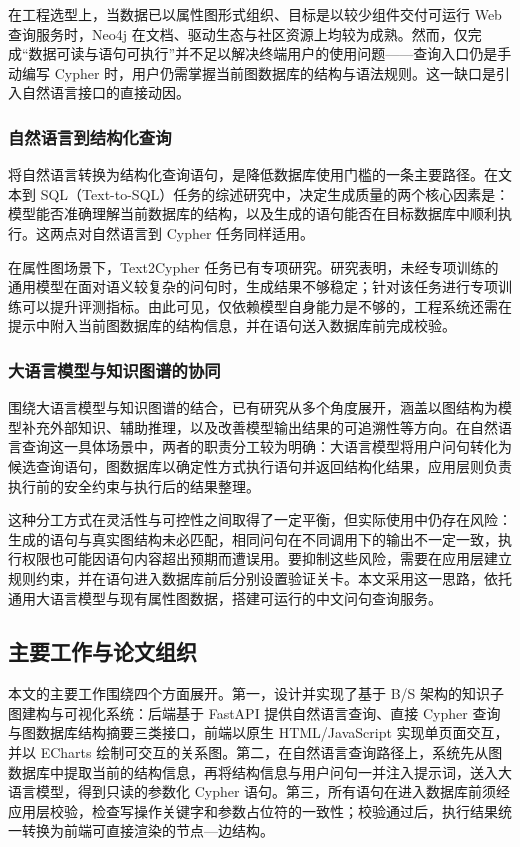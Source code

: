 \documentclass[12pt,a4paper]{article}
\begin{document}
在工程选型上，当数据已以属性图形式组织、目标是以较少组件交付可运行 Web 查询服务时，Neo4j 在文档、驱动生态与社区资源上均较为成熟\cite{ref12}。然而，仅完成“数据可读与语句可执行”并不足以解决终端用户的使用问题——查询入口仍是手动编写 Cypher 时，用户仍需掌握当前图数据库的结构与语法规则。这一缺口是引入自然语言接口的直接动因。

\subsubsection{自然语言到结构化查询}

将自然语言转换为结构化查询语句，是降低数据库使用门槛的一条主要路径。在文本到 SQL（Text-to-SQL）任务的综述研究中，决定生成质量的两个核心因素是：模型能否准确理解当前数据库的结构，以及生成的语句能否在目标数据库中顺利执行\cite{ref5}。这两点对自然语言到 Cypher 任务同样适用。

在属性图场景下，Text2Cypher 任务已有专项研究。研究表明，未经专项训练的通用模型在面对语义较复杂的问句时，生成结果不够稳定；针对该任务进行专项训练可以提升评测指标\cite{ref16}。由此可见，仅依赖模型自身能力是不够的，工程系统还需在提示中附入当前图数据库的结构信息，并在语句送入数据库前完成校验。

\subsubsection{大语言模型与知识图谱的协同}

围绕大语言模型与知识图谱的结合，已有研究从多个角度展开，涵盖以图结构为模型补充外部知识、辅助推理，以及改善模型输出结果的可追溯性等方向\cite{ref11}。在自然语言查询这一具体场景中，两者的职责分工较为明确：大语言模型将用户问句转化为候选查询语句，图数据库以确定性方式执行语句并返回结构化结果，应用层则负责执行前的安全约束与执行后的结果整理\cite{ref4,ref9,ref11}。

这种分工方式在灵活性与可控性之间取得了一定平衡，但实际使用中仍存在风险：生成的语句与真实图结构未必匹配，相同问句在不同调用下的输出不一定一致，执行权限也可能因语句内容超出预期而遭误用。要抑制这些风险，需要在应用层建立规则约束，并在语句进入数据库前后分别设置验证关卡。本文采用这一思路，依托通用大语言模型与现有属性图数据，搭建可运行的中文问句查询服务。

\subsection{主要工作与论文组织}

本文的主要工作围绕四个方面展开。第一，设计并实现了基于 B/S 架构的知识子图建构与可视化系统：后端基于 FastAPI 提供自然语言查询、直接 Cypher 查询与图数据库结构摘要三类接口，前端以原生 HTML/JavaScript 实现单页面交互，并以 ECharts 绘制可交互的关系图。第二，在自然语言查询路径上，系统先从图数据库中提取当前的结构信息，再将结构信息与用户问句一并注入提示词，送入大语言模型，得到只读的参数化 Cypher 语句。第三，所有语句在进入数据库前须经应用层校验，检查写操作关键字和参数占位符的一致性；校验通过后，执行结果统一转换为前端可直接渲染的节点—边结构。
\end{document}
